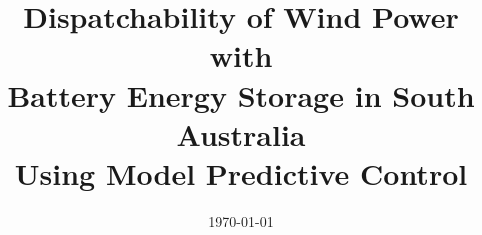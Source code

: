 

\usepackage{lipsum}
\usepackage{textcomp}
\usepackage{esvect}

\setcounter{MaxMatrixCols}{20}				%

\renewcommand{\descriptionlabel}[1]{		%
	\hspace\labelsep\upshape\bfseries #1.
}

\def\mwmwh{\delta}
\def\eff{\eta}

\usepackage[authoryear, round]{natbib}
	\renewcommand{\bibfont}{\normalfont\small}	%
	

\title[Dispatchability of Wind Power with Battery Energy Storage in SA Using MPC]{Dispatchability of Wind Power with\\Battery Energy Storage in South Australia\\Using Model Predictive Control}


\date{\today}



\maketitle

